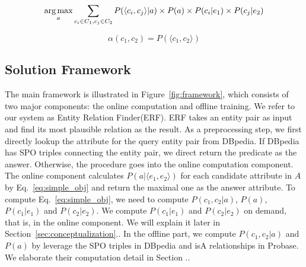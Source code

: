 \begin{equation}
\label{eq:simple_obj}
 \operatorname*{arg\,max}_a \sum_{c_i\in C_1, c_j\in C_2} P(\langle c_{i},c_{j}\rangle |a)\times P(a)\times P(c_i|e_1)\times P(c_j|e_2)
\end{equation}

\begin{equation}\label{eq:rel_jdp}
  \alpha(c_1,c_2) = P(\langle c_1, c_2\rangle)
\end{equation}






\subsection{Solution Framework}
The main framework is illustrated in Figure~\ref{fig:framework}, which consists of two major components: the online computation and offline training. We refer to our system as \ac{Entity Relation Finder(ERF)}.
ERF takes an entity pair as input and find its most plausible relation as the result.
As a preprocessing step, we first directly lookup the attribute for the query entity pair from DBpedia.
If DBpedia has SPO triples connecting the entity pair, we direct return the predicate as the answer.
Otherwise, the procedure goes into the online computation component.
The online component calculates $ P(a|  \langle e_1,e_2 \rangle  )$ for each candidate attribute in $A$ by Eq.~\ref{eq:simple_obj} and return the maximal one as the answer attribute. To compute Eq.~\ref{eq:simple_obj}, we need to compute $P(c_1,c_2|a)$, $P(a)$, $P(c_1|e_1)$ and $P(c_2|e_2)$. We compute $P(c_1|e_1)$ and $P(c_2|e_2)$ on demand, that is, in the online component. We will explain it later in Section~\ref{sec:conceptualization}..
In the offline part, we compute $P(c_1,c_2|a)$ and $P(a)$ by leverage the SPO triples in DBpedia and isA relationships in Probase.
We elaborate their computation detail in Section ..

